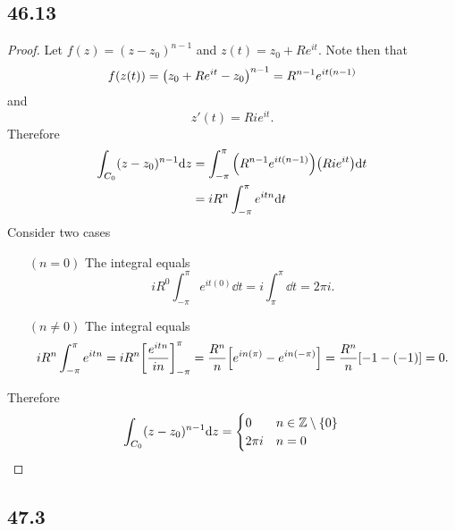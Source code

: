 \documentclass[12pt,titlepage]{extarticle}
\begin{document}
\subsection*{46.13}
\begin{proof}
    Let $f(z) = (z - z_0)^{n-1}$ and $z(t) = z_0 + Re^{i t}$. Note then that
    \[
        f(z(t)) = \qty(z_0 + Re^{i t} - z_0)^{n-1} = R^{n-1} e^{it(n-1)}
    \]
    and
    \[
        z'(t) = Ri e^{it}
    .\]
    Therefore
    \begin{align*}
        \int_{C_0} (z-z_0)^{n-1} \dd z &= \int_{-\pi}^{\pi} \qty(R^{n-1} e^{it(n-1)})\qty(R i e^{it}) \dd t \\
                                       &= i R^n \int_{-\pi}^{\pi} e^{itn} \dd t
    \end{align*}
    Consider two cases
    \begin{enumerate}[leftmargin=2cm]
        \item[$(n = 0)$]
            The integral equals
            \[
                iR^0 \int_{-\pi}^{\pi} e^{it (0)} \dd t = i \int_{\pi}^{\pi} \dd t = 2 \pi i
            .\]
        \item[$(n \neq 0)$]
            The integral equals
                \[
                    iR^n \int_{-\pi}^{\pi} e^{itn} = iR^n \qty[\frac{e^{itn}}{i n}]_{-\pi}^\pi = \frac{R^n}{n} \qty[e^{in(\pi)} - e^{in(-\pi)}] = \frac{R^n}{n} \qty[-1 - (-1)] = 0
                .\]
    \end{enumerate}
    Therefore
    \[
        \int_{C_0} (z-z_0)^{n-1} \dd z = \begin{cases}
            0 & n \in \mathbb{Z} \setminus \qty{0} \\
            2 \pi i & n = 0
        \end{cases} \qedhere
    \]
\end{proof}

\subsection*{47.3}
\begin{wrapfigure}{r}{6cm}
\end{wrapfigure}
\end{document}
